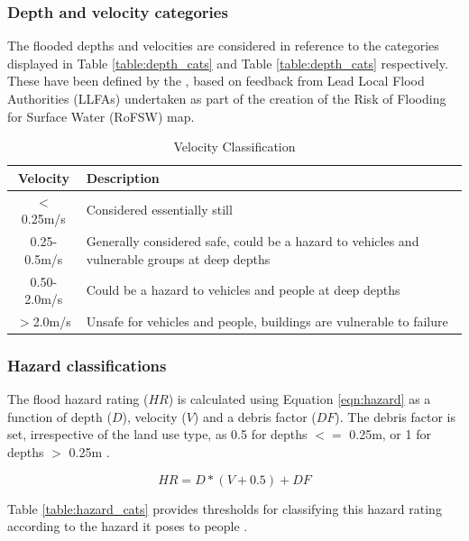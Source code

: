 \documentclass[APA,Times2COL]{WileyNJDv5}
\begin{document}
\subsubsection{Depth and velocity categories}\label{sec:sec:depth_cat}
The flooded depths and velocities are considered in reference to the categories displayed in Table \ref{table:depth_cats} and Table \ref{table:depth_cats} respectively. These have been defined by the \citet{environment2019risk}, based on feedback from Lead Local Flood Authorities (LLFAs) undertaken as part of the creation of the Risk of Flooding for Surface Water (RoFSW) map. 

\begingroup
\setlength{\tabcolsep}{10pt} %
\renewcommand{\arraystretch}{1.5} %
\begin{table}[h!]
\centering
\caption{Velocity Classification \citep{environment2019risk}}
\begin{tabular}{c C{13cm}} 
 \hline
 \textbf{Velocity} & \textbf{Description} \\ [0.5ex] 
  \hline
 $<$0.25m/s & Considered essentially still \\
 0.25-0.5m/s & Generally considered safe, could be a hazard to vehicles and vulnerable 
groups at deep depths \\
 0.50-2.0m/s & Could be a hazard to vehicles and people at deep depths\\
 $>$2.0m/s & Unsafe for vehicles and people, buildings are vulnerable to failure\\[1ex] 
 \hline
\end{tabular}
\label{table:velocity_cats}
\end{table}
\endgroup

\subsubsection{Hazard classifications}\label{subsec:hazard}
The flood hazard rating ($HR$) is calculated using Equation \ref{eqn:hazard} as a function of depth ($D$), velocity ($V$) and a debris factor ($DF$). The debris factor is set, irrespective of the land use type, as 0.5 for depths $<=$ 0.25m, or 1 for depths $>$ 0.25m \citep{environment2019risk}.

\begin{equation}
HR = D * (V +0.5) + DF
  \label{eqn:hazard}
\end{equation}

Table \ref{table:hazard_cats} provides thresholds for classifying this hazard rating according to the hazard it poses to people \citep{surendran2008supplementary}.
\end{document}
